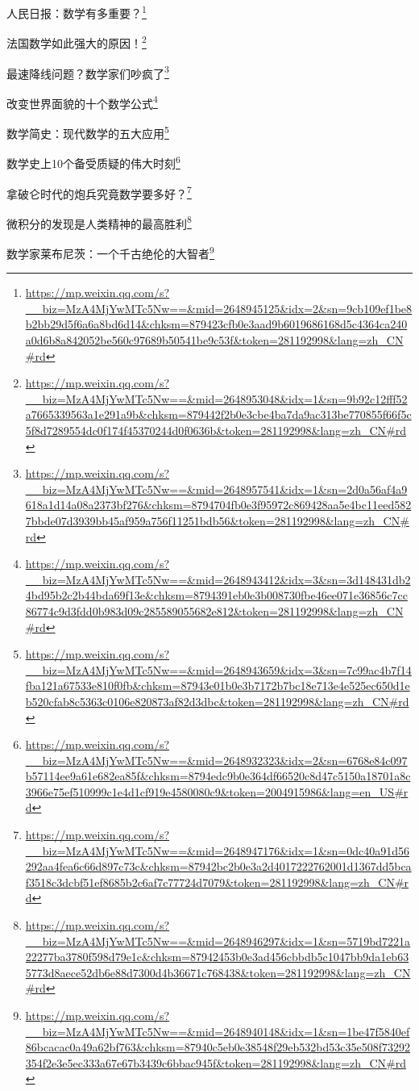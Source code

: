 \documentclass[]{ctexbook}
\renewcommand{\href}[2]{#2\footnote{\url{#1}}}
\begin{document}
\href{https://mp.weixin.qq.com/s?__biz=MzA4MjYwMTc5Nw==\&mid=2648945125\&idx=2\&sn=9cb109ef1be8b2bb29d5f6a6a8bd6d14\&chksm=879423cfb0e3aad9b6019686168d5c4364ca240a0d6b8a842052be560c97689b50541be9c53f\&token=281192998\&lang=zh_CN\#rd}{人民日报：数学有多重要？}

\href{https://mp.weixin.qq.com/s?__biz=MzA4MjYwMTc5Nw==\&mid=2648953048\&idx=1\&sn=9b92c12fff52a7665339563a1e291a9b\&chksm=879442f2b0e3cbe4ba7da9ac313be770855f66f5c5f8d7289554dc0f174f45370244d0f0636b\&token=281192998\&lang=zh_CN\#rd}{法国数学如此强大的原因！}

\href{https://mp.weixin.qq.com/s?__biz=MzA4MjYwMTc5Nw==\&mid=2648957541\&idx=1\&sn=2d0a56af4a9618a1d14a08a2373bf276\&chksm=8794704fb0e3f95972c869428aa5e4bc11eed5827bbde07d3939bb45af959a756f11251bdb56\&token=281192998\&lang=zh_CN\#rd}{最速降线问题？数学家们吵疯了}

\href{https://mp.weixin.qq.com/s?__biz=MzA4MjYwMTc5Nw==\&mid=2648943412\&idx=3\&sn=3d148431db24bd95b2c2b44bda69f13e\&chksm=8794391eb0e3b008730fbe46ee071e36856c7cc86774c9d3fdd0b983d09c285589055682e812\&token=281192998\&lang=zh_CN\#rd}{改变世界面貌的十个数学公式}

\href{https://mp.weixin.qq.com/s?__biz=MzA4MjYwMTc5Nw==\&mid=2648943659\&idx=3\&sn=7c99ac4b7f14fba121a67533e810f0fb\&chksm=87943e01b0e3b7172b7bc18e713e4e525ec650d1eb520cfab8c5363c0106e820873af82d3dbc\&token=281192998\&lang=zh_CN\#rd}{数学简史：现代数学的五大应用}

\href{https://mp.weixin.qq.com/s?__biz=MzA4MjYwMTc5Nw==\&mid=2648932323\&idx=2\&sn=6768e84c097b57114ee9a61e682ea85f\&chksm=8794edc9b0e364df66520c8d47c5150a18701a8c3966e75ef510999c1e4d1cf919e4580080c9\&token=2004915986\&lang=en_US\#rd}{数学史上10个备受质疑的伟大时刻}

\href{https://mp.weixin.qq.com/s?__biz=MzA4MjYwMTc5Nw==\&mid=2648947176\&idx=1\&sn=0dc40a91d56292aa4fea6c66d897c73c\&chksm=87942bc2b0e3a2d4017222762001d1367dd5bcaf3518c3dcbf51ef8685b2c6af7c77724d7079\&token=281192998\&lang=zh_CN\#rd}{拿破仑时代的炮兵究竟数学要多好？}

\href{https://mp.weixin.qq.com/s?__biz=MzA4MjYwMTc5Nw==\&mid=2648946297\&idx=1\&sn=5719bd7221a22277ba3780f598d79e1c\&chksm=87942453b0e3ad456cbbdb5c1047bb9da1eb635773d8aece52db6e88d7300d4b36671c768438\&token=281192998\&lang=zh_CN\#rd}{微积分的发现是人类精神的最高胜利}

\href{https://mp.weixin.qq.com/s?__biz=MzA4MjYwMTc5Nw==\&mid=2648940148\&idx=1\&sn=1be47f5840ef86bcacac0a49a62bf763\&chksm=87940c5eb0e38548f29eb532bd53c35e508f73292354f2e3e5ec333a67e67b3439c6bbac945f\&token=281192998\&lang=zh_CN\#rd}{数学家莱布尼茨：一个千古绝伦的大智者}
\end{document}
